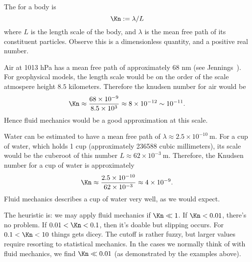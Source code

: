 \begin{node}
\begin{definition}\label{fluids:describing-000C}%
The  for a body is
\begin{equation}
\Kn := \lambda/L
\end{equation}
where $L$ is the length scale of the body, and $\lambda$ is the mean
free path of its constituent particles. Observe this is a dimensionless
quantity, and a positive real number.

\begin{example}\label{fluids:describing-000E}%
Air at 1013 hPa has a mean free path of approximately 68 nm (see
Jennings~\cite{jennings1988air}). For geophysical models, the length
scale would be on the order of the scale atmospere height $8.5$
kilometers. Therefore the knudsen number for air would be
\begin{equation}
\Kn\approx\frac{68\times 10^{-9}}{8.5\times 10^{3}}\approx8\times 10^{-12}\sim10^{-11}.
\end{equation}
Hence fluid mechanics would be a good approximation at this scale.
\end{example}

\begin{example}\label{fluids:describing-000G}%
Water can be estimated to have a mean free path of
$\lambda\approx2.5\times10^{-10}~\mathrm{m}$. For a cup of water, which
holds 1 cup (approximately 236588 cubic millimeters), its scale would be
the cuberoot of this number $L\approx 62\times10^{-3}~\mathrm{m}$.
Therefore, the Knudsen number for a cup of water is approximately
\begin{equation}
\Kn\approx\frac{2.5\times10^{-10}}{62\times10^{-3}}\approx4\times10^{-9}.
\end{equation}
Fluid mechanics describes a cup of water very well, as we would expect.
\end{example}
\end{definition}

\begin{node}\label{fluids:describing-000D}%
The heuristic is: we may apply fluid mechanics if $\Kn\ll1$. If
$\Kn<0.01$, there's no problem. If $0.01<\Kn<0.1$, then it's
doable but slipping occurs. For $0.1<\Kn<10$ things gets dicey. The
cutoff is rather fuzzy, but larger values require resorting to
statistical mechanics. In the cases we normally think of with fluid
mechanics, we find $\Kn\ll0.01$ (as demonstrated by the examples above).
\end{node}


\end{node}
